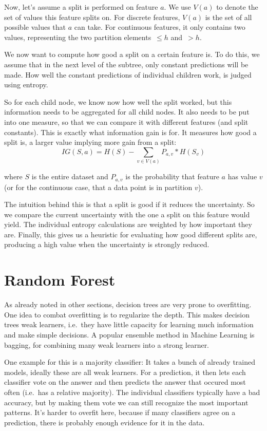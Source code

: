 \documentclass[a4paper]{article}
\begin{document}
Now, let's assume a split is performed on feature $a$.
We use $V(a)$ to denote the set of values this feature splits on. For discrete features, $V(a)$ is the set of all possible values that $a$ can take. For continuous features, it only contains two values, representing the two partition elements~$\le h$ and~$> h$.

We now want to compute how good a split on a certain feature is.
To do this, we assume that in the next level of the subtree, only constant predictions will be made. How well the constant predictions of individual children work, is judged using entropy.

So for each child node, we know now how well the split worked, but this information needs to be aggregated for all child nodes. It also needs to be put into one measure, so that we can compare it with different features (and split constants). This is exactly what information gain is for. It measures how good a split is, a larger value implying more gain from a split:
\[
	\mathit{IG}(S, a) = H(S) - \sum\limits_{v \in V(a)} P_{a, v} * H(S_v)
\]

\noindent where $S$ is the entire dataset and $P_{a, v}$ is the probability that feature $a$ has value $v$ (or for the continuous case, that a data point is in partition $v$).

The intuition behind this is that a split is good if it reduces the uncertainty. So we compare the current uncertainty with the one a split on this feature would yield. The individual entropy calculations are weighted by how important they are. Finally, this gives us a heuristic for evaluating how good different splits are, producing a high value when the uncertainty is strongly reduced.

\section{Random Forest}

As already noted in other sections, decision trees are very prone to overfitting. One idea to combat overfitting is to regularize the depth. This makes decision trees weak learners, i.e.\ they have little capacity for learning much information and make simple decisions. A popular ensemble method in Machine Learning is bagging, for combining many weak learners into a strong learner.

One example for this is a majority classifier: It takes a bunch of already trained models, ideally these are all weak learners. For a prediction, it then lets each classifier vote on the answer and then predicts the answer that occured most often (i.e.\ has a relative majority). The individual classifiers typically have a bad accuracy, but by making them vote we can still recognize the most important patterns. It's harder to overfit here, because if many classifiers agree on a prediction, there is probably enough evidence for it in the data.
\end{document}
